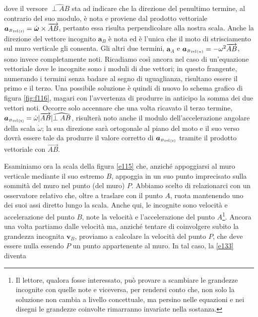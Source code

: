 \noindent dove il versore
$\widehat{{\perp{AB}}}$ sta ad indicare che la direzione del penultimo termine, al contrario del suo
modulo, \`e nota e proviene dal prodotto vettoriale
${{{\bm a}_{\scriptscriptstyle{B}}}_{\scriptscriptstyle{{\rm rel}}}}_{\scriptscriptstyle{(t)}}=
\dot{\bm\omega}\times\overrightarrow{AB}$,
pertanto essa risulta perpendicolare alla nostra scala.
Anche la direzione del vettore incognito ${{\bm a}_{\scriptscriptstyle{B}}}$
\`e nota ed \`e l'unica che il moto di strisciamento sul
muro verticale gli consenta.
Gli altri due termini, ${{\bm a}_{\scriptscriptstyle{A}}}$ e
${{{\bm a}_{\scriptscriptstyle{B}}}_{\scriptscriptstyle{{\rm rel}}}}_{\scriptscriptstyle{(n)}}=-\omega^2 \overrightarrow{AB}$, sono
invece completamente noti.
Ricadiamo cos\`i ancora nel caso di un'equazione vettoriale dove le incognite sono i moduli di due vettori; in questo frangente,
numerando i termini senza badare al segno di uguaglianza, risultano essere il primo e il terzo.
Una possibile soluzione \`e quindi di nuovo
lo schema grafico di figura \ref{fig:f116}, magari con l'avvertenza di produrre in
anticipo la somma dei due vettori noti. 
Occorre solo accennare che una volta ricavato
il terzo termine, 
${{{\bm a}_{\scriptscriptstyle{B}}}_{\scriptscriptstyle{{\rm rel}}}}_{\scriptscriptstyle{(t)}}=
\dot{\omega}|\overrightarrow{AB}|\widehat{{\perp{AB}}}$, risulter\`a noto anche
il modulo  dell'accelerazione 
angolare della scala $\dot{\omega}$; la sua direzione sar\`a ortogonale
al piano del moto e il suo verso dovr\`a
essere tale da produrre il
valore corretto di 
${{{\bm a}_{\scriptscriptstyle{B}}}_{\scriptscriptstyle{{\rm rel}}}}_{\scriptscriptstyle{(t)}}$
tramite il prodotto vettoriale con $\overrightarrow{AB}$.


\noindent Esaminiamo ora la scala della figura \ref{e115} che, anzich\'e appoggiarsi al muro verticale
mediante il suo estremo $B$, appoggia in un suo punto imprecisato sulla sommit\`a del muro nel
punto (del muro) $P$. Abbiamo scelto di relazionarci con un osservatore relativo
che, oltre a traslare con il punto $A$, ruota mantenendo uno dei suoi assi diretto
lungo la scala.
Anche qui, le incognite sono velocit\`a e accelerazione del punto $B$, note la velocit\`a
e l'accelerazione del punto $A$\footnote
{
Il lettore, qualora fosse interessato, pu\`o provare
a scambiare le grandezze incognite con quelle note e viceversa, per rendersi
conto che, non solo la soluzione non cambia a livello concettuale, ma persino
nelle equazioni e nei disegni le grandezze coinvolte
rimarranno invariate nella sostanza.
}.
Ancora una volta partiamo dalle velocit\`a ma, anzich\'e tentare di coinvolgere subito
la grandezza incognita  
${{\bm v}_{\scriptscriptstyle{B}}}$,
proviamo a calcolare la velocit\`a del punto $P$, che deve essere nulla essendo
$P$ un punto appartenente al muro.
In tal caso, la \ref{e133} diventa

